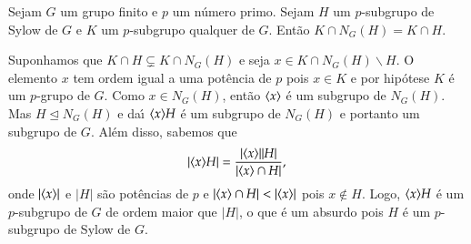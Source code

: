 \begin{lema}\label{intersecao_de_Sylow_com_normalizador}
	Sejam $G$ um grupo finito e $p$ um n\'umero primo. Sejam $H$ um $p$-subgrupo de Sylow de $G$ e $K$ um $p$-subgrupo qualquer de $G$. Ent\~ao $K \cap N_G(H) = K \cap H$.
\end{lema}
\begin{prova}
	Suponhamos que $K \cap H \varsubsetneq K \cap N_G(H)$ e seja $x \in K \cap N_G(H)\backslash H$. O elemento $x$ tem ordem igual a uma pot\^encia de $p$ pois $x \in K$ e por hip\'otese $K$ \'e um $p$-grupo de $G$. Como $x \in N_G(H)$, ent\~ao $\langle{x}\rangle$ \'e um subgrupo de $N_G(H)$. Mas $H \unlhd N_G(H)$ e da{\'\i} $\langle{x}\rangle H$ \'e um subgrupo de $N_G(H)$ e portanto um subgrupo de $G$. Al\'em disso, sabemos que
	\[
		|\langle{x}\rangle H| = \dfrac{|\langle{x}\rangle||H|}{|\langle{x}\rangle\cap H|},
	\]
	onde $|\langle{x}\rangle|$ e $|H|$ s\~ao pot\^encias de $p$ e $|\langle{x}\rangle\cap H| < |\langle{x}\rangle|$ pois $x \notin H$. Logo, $\langle{x}\rangle H$ \'e um $p$-subgrupo de $G$ de ordem maior que $|H|$, o que \'e um absurdo pois $H$ \'e um $p$-subgrupo de Sylow de $G$.
\end{prova}

